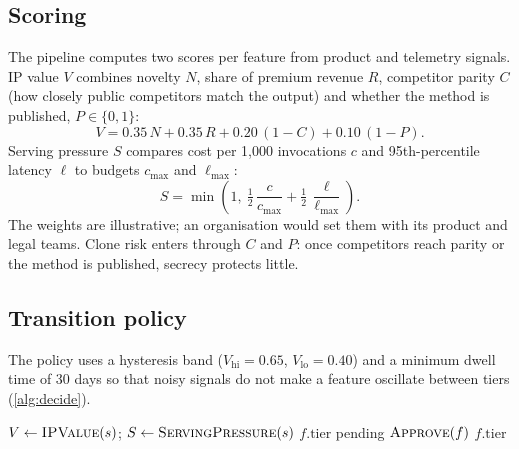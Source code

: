 \subsection{Scoring}
The pipeline computes two scores per feature from product and telemetry signals. IP value
\(V\) combines novelty \(N\), share of premium revenue \(R\), competitor parity \(C\) (how
closely public competitors match the output) and whether the method is published,
\(P \in \{0,1\}\):
\begin{equation}\label{eq:value}
  V = 0.35\,N + 0.35\,R + 0.20\,(1 - C) + 0.10\,(1 - P).
\end{equation}
Serving pressure \(S\) compares cost per 1,000 invocations \(c\) and 95th-percentile
latency \(\ell\) to budgets \(c_{\max}\) and \(\ell_{\max}\):
\begin{equation}\label{eq:pressure}
  S = \min\!\left(1,\ \tfrac{1}{2}\,\frac{c}{c_{\max}} + \tfrac{1}{2}\,\frac{\ell}{\ell_{\max}}\right).
\end{equation}
The weights are illustrative; an organisation would set them with its product and legal
teams. Clone risk enters through \(C\) and \(P\): once competitors reach parity or the
method is published, secrecy protects little.

\subsection{Transition policy}\label{sec:transition}
The policy uses a hysteresis band (\(V_{\text{hi}} = 0.65\), \(V_{\text{lo}} = 0.40\)) and
a minimum dwell time of 30 days so that noisy signals do not make a feature oscillate
between tiers (\cref{alg:decide}).

\begin{algorithm}[htbp]
\caption{(feature \(f\), signals \(s\))}\label{alg:decide}
\small
\begin{algorithmic}[1]
\State \(V \gets \textsc{IPValue}(s)\); \(S \gets \textsc{ServingPressure}(s)\) 
 \Return {}  \EndIf
{} \Return \(f.\text{tier}\) \EndIf
{} \Return {} \EndIf
{}
  \State \Return {} pending \(\textsc{Approve}(f)\) 
\EndIf
\State \Return \(f.\text{tier}\)
\end{algorithmic}
\end{algorithm}

